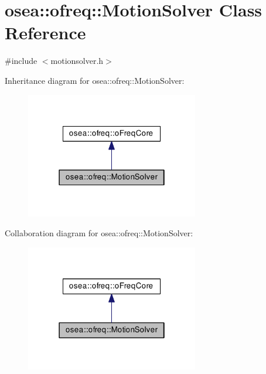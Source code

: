 \hypertarget{classosea_1_1ofreq_1_1_motion_solver}{\section{osea\-:\-:ofreq\-:\-:Motion\-Solver Class Reference}
\label{classosea_1_1ofreq_1_1_motion_solver}
}


{\ttfamily \#include $<$motionsolver.\-h$>$}



Inheritance diagram for osea\-:\-:ofreq\-:\-:Motion\-Solver\-:
\nopagebreak
\begin{figure}[H]
\begin{center}
\leavevmode
\includegraphics[width=214pt]{classosea_1_1ofreq_1_1_motion_solver__inherit__graph}
\end{center}
\end{figure}


Collaboration diagram for osea\-:\-:ofreq\-:\-:Motion\-Solver\-:
\nopagebreak
\begin{figure}[H]
\begin{center}
\leavevmode
\includegraphics[width=214pt]{classosea_1_1ofreq_1_1_motion_solver__coll__graph}
\end{center}
\end{figure}
